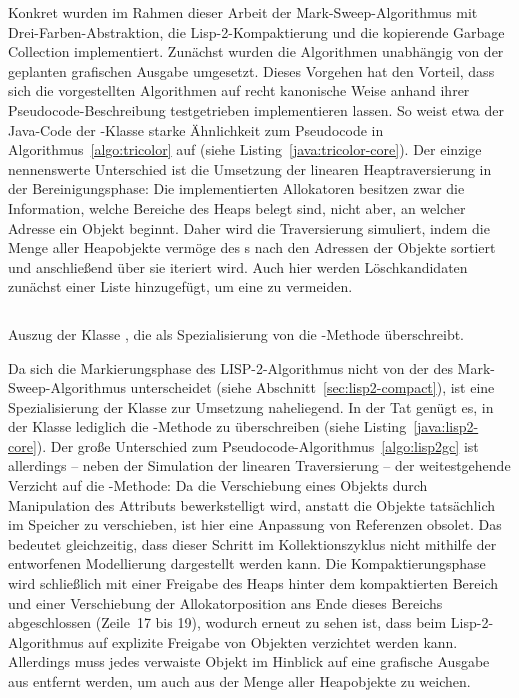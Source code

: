 Konkret wurden im Rahmen dieser Arbeit der Mark-Sweep-Algorithmus mit Drei-Farben-Abstraktion, die Lisp-2-Kompaktierung und die kopierende Garbage Collection implementiert.
Zunächst wurden die Algorithmen unabhängig von der geplanten grafischen Ausgabe umgesetzt.
Dieses Vorgehen hat den Vorteil, dass sich die vorgestellten Algorithmen auf recht kanonische Weise anhand ihrer Pseudocode-Beschreibung testgetrieben implementieren lassen.
So weist etwa der Java-Code der -Klasse starke Ähnlichkeit zum Pseudocode in Algorithmus~\ref{algo:tricolor} auf (siehe Listing~\ref{java:tricolor-core}).
Der einzige nennenswerte Unterschied ist die Umsetzung der linearen Heaptraversierung in der Bereinigungsphase:
Die implementierten Allokatoren besitzen zwar die Information, welche Bereiche des Heaps belegt sind, nicht aber, an welcher Adresse ein Objekt beginnt.
Daher wird die Traversierung simuliert, indem die Menge  aller Heapobjekte vermöge des s nach den Adressen der Objekte sortiert und anschließend über sie iteriert wird.
Auch hier werden Löschkandidaten zunächst einer Liste  hinzugefügt, um eine  zu vermeiden.

\begin{listing}[t!]
	\inputminted[]{java}{code/Lisp2-core.java}
	\caption[Auszug der Klasse ]{Auszug der Klasse , die als Spezialisierung von  die -Methode überschreibt.}
	\label{java:lisp2-core}
\end{listing}

Da sich die Markierungsphase des LISP-2-Algorithmus nicht von der des Mark-Sweep-Algorithmus unterscheidet (siehe Abschnitt~\ref{sec:lisp2-compact}), ist eine Spezialisierung der Klasse  zur Umsetzung naheliegend.
In der Tat genügt es, in der Klasse lediglich die -Methode zu überschreiben (siehe Listing~\ref{java:lisp2-core}).
Der große Unterschied zum Pseudocode-Algorithmus~\ref{algo:lisp2gc} ist allerdings -- neben der Simulation der linearen Traversierung -- der weitestgehende Verzicht auf die -Methode:
Da die Verschiebung eines Objekts durch Manipulation des Attributs  bewerkstelligt wird, anstatt die Objekte tatsächlich im Speicher zu verschieben, ist hier eine Anpassung von Referenzen obsolet.
Das bedeutet gleichzeitig, dass dieser Schritt im Kollektionszyklus nicht mithilfe der entworfenen Modellierung dargestellt werden kann.
Die Kompaktierungsphase wird schließlich mit einer Freigabe des Heaps hinter dem kompaktierten Bereich und einer Verschiebung der Allokatorposition ans Ende dieses Bereichs abgeschlossen (Zeile~17 bis 19), wodurch erneut zu sehen ist, dass beim Lisp-2-Algorithmus auf explizite Freigabe von Objekten verzichtet werden kann.
Allerdings muss jedes verwaiste Objekt im Hinblick auf eine grafische Ausgabe aus  entfernt werden, um auch aus der Menge aller Heapobjekte zu weichen.

